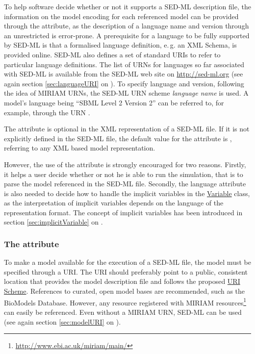 To help  software decide whether or not it supports a SED-ML description file, the information on the model encoding for each referenced model can be provided through the  attribute, as the description of a language name and version through an unrestricted  is error-prone. 
A prerequisite for a language to be fully supported by SED-ML is that a formalised language definition, e.\,g. an XML Schema, is provided online. SED-ML also defines a set of standard URIs to refer to particular language definitions. 
The list of URNs for languages so far associated with SED-ML is available from the SED-ML web site on \url{http://sed-ml.org}  (see again section \ref{sec:languageURI} on ). 
To specify language and version, following the idea of MIRIAM URNs, the SED-ML URN scheme \emph{language name} is used. A model's language being ``SBML Level 2 Version 2'' can be referred to, for example, through the URN .

The  attribute is optional in the XML representation of a SED-ML file. 
If it is not explicitly defined in the SED-ML file, the default value for the  attribute is , referring to any XML based model representation. 

However, the use of the  attribute is strongly encouraged for two reasons. 
Firstly, it helps a user decide whether or not he is able to run the simulation, that is to parse the model referenced in the SED-ML file. 
Secondly, the language attribute is also needed to decide how to handle the implicit variables in the \hyperref[class:variable]{Variable} class, as the interpretation of implicit variables depends on the language of the representation format. The concept of implicit variables has been introduced in section \ref{sec:implicitVariable} on .


\subsubsection{The  attribute}
\label{sec:source}
To make a model available for the execution of a SED-ML file, the model  must be specified through a URI. 
The URI should preferably point to a public, consistent location that provides the model description file and follows the proposed \hyperref[sec:uriScheme]{URI Scheme}.
References to curated, open model bases are recommended, such as the BioModels Database. However, any resource registered with MIRIAM resources\footnote{\url{http://www.ebi.ac.uk/miriam/main/}} can easily be referenced. Even without a MIRIAM URN, SED-ML can be used (see again section \ref{sec:modelURI} on ).

